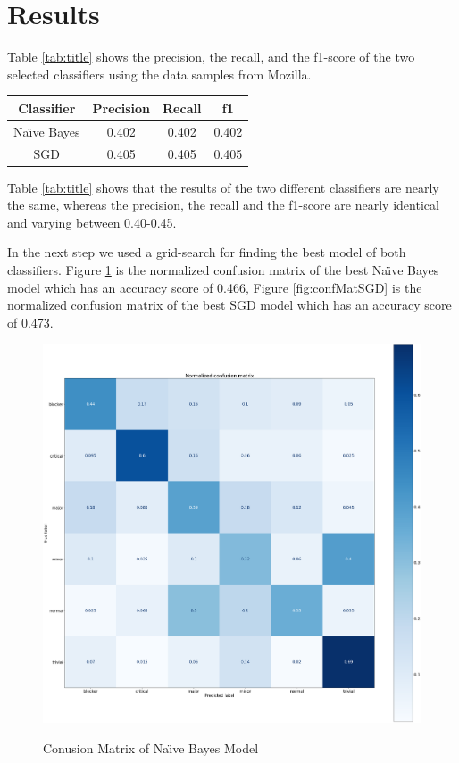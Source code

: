 \documentclass[sigconf,screen]{acmart}
\begin{document}
\section{Results}
Table \ref{tab:title} shows the precision, the recall, and the f1-score of the two selected classifiers using the data samples from Mozilla.

\begin{center}
	\centering
	\label{tab:title} 
	\begin{tabular}{ |c|c|c|c| } 
		\hline
		\textbf{Classifier} & \textbf{Precision} & \textbf{Recall} & \textbf{f1} \\
		\hline
		Na{\"\i}ve Bayes & 0.402 & 0.402 & 0.402 \\
		\hline
		SGD & 0.405 & 0.405 & 0.405 \\
		\hline
	\end{tabular}
\end{center}

Table \ref{tab:title} shows that the results of the two different classifiers are nearly the same, whereas the precision, the recall and the f1-score are nearly identical and varying between 0.40-0.45.

In the next step we used a grid-search for finding the best model of both classifiers. Figure \ref{fig:confMatNB} is the normalized confusion matrix of the best Na{\"\i}ve Bayes model which has an accuracy score of 0.466,  Figure \ref{fig:confMatSGD} is the normalized confusion matrix of the best SGD model which has an accuracy score of 0.473.

\begin{figure}[h]
	\caption{Conusion Matrix of Na{\"\i}ve Bayes Model}
	\centering
	\includegraphics[scale=0.1]{norm_conf_matrix_nb}
	\label{fig:confMatNB}	
\end{figure}
\end{document}
